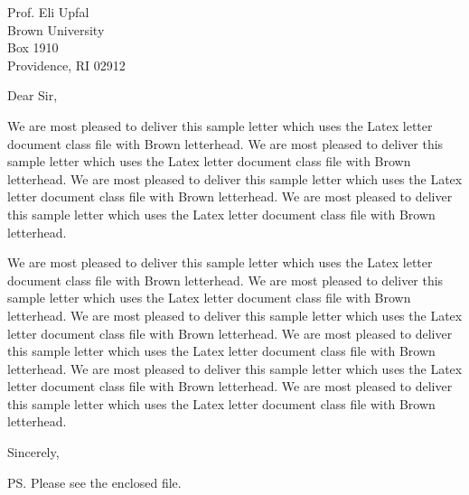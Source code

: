 \documentclass[11pt]{brownletter}
\date{December 15, 2003} %
\begin{document}
\begin{letter}{Prof. Eli Upfal\\ 
               Brown University\\ 
               Box 1910\\ 
               Providence, RI 02912}

\opening{Dear Sir,}

We are most pleased to deliver this sample letter which uses
the Latex letter document class file with Brown letterhead.
We are most pleased to deliver this sample letter which uses
the Latex letter document class file with Brown letterhead.
We are most pleased to deliver this sample letter which uses
the Latex letter document class file with Brown letterhead.
We are most pleased to deliver this sample letter which uses
the Latex letter document class file with Brown letterhead.

We are most pleased to deliver this sample letter which uses
the Latex letter document class file with Brown letterhead.
We are most pleased to deliver this sample letter which uses
the Latex letter document class file with Brown letterhead.
We are most pleased to deliver this sample letter which uses
the Latex letter document class file with Brown letterhead.
We are most pleased to deliver this sample letter which uses
the Latex letter document class file with Brown letterhead.
We are most pleased to deliver this sample letter which uses
the Latex letter document class file with Brown letterhead.
We are most pleased to deliver this sample letter which uses
the Latex letter document class file with Brown letterhead.

\closing{Sincerely,}


\ps{Please see the enclosed file.}


\end{letter}
\end{document}
